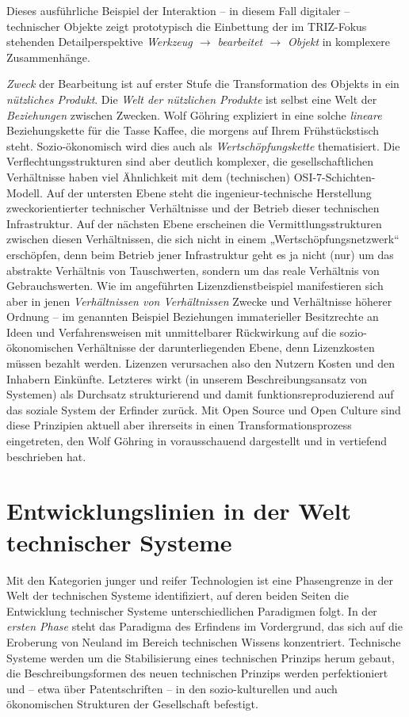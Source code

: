\documentclass[12pt,a4paper]{article}
\begin{document}
Dieses ausführliche Beispiel der Interaktion -- in diesem Fall digitaler --
technischer Objekte zeigt prototypisch die Einbettung der im TRIZ-Fokus
stehenden Detailperspektive \emph{Werkzeug $\to$ bearbeitet $\to$ Objekt} in
komplexere Zusammenhänge.

\emph{Zweck} der Bearbeitung ist auf erster Stufe die Transformation des
Objekts in ein \emph{nützliches Produkt}. Die \emph{Welt der nützlichen
  Produkte} ist selbst eine Welt der \emph{Beziehungen} zwischen Zwecken.
Wolf Göhring expliziert in \cite{Goehring1999} eine solche \emph{lineare}
Beziehungskette für die Tasse Kaffee, die morgens auf Ihrem Frühstückstisch
steht. Sozio-ökonomisch wird dies auch als \emph{Wertschöpfungskette}
thematisiert. Die Verflechtungsstrukturen sind aber deutlich komplexer, die
gesellschaftlichen Verhältnisse haben viel Ähnlichkeit mit dem (technischen)
OSI-7-Schichten-Modell. Auf der untersten Ebene steht die ingenieur-technische
Herstellung zweckorientierter technischer Verhältnisse und der Betrieb dieser
technischen Infrastruktur.  Auf der nächsten Ebene erscheinen die
Vermittlungsstrukturen zwischen diesen Verhältnissen, die sich nicht in einem
„Wertschöpfungsnetzwerk“ erschöpfen, denn beim Betrieb jener Infrastruktur
geht es ja nicht (nur) um das abstrakte Verhältnis von Tauschwerten, sondern
um das reale Verhältnis von Gebrauchswerten.  Wie im angeführten
Lizenzdienstbeispiel manifestieren sich aber in jenen \emph{Verhältnissen von
  Verhältnissen} Zwecke und Verhältnisse höherer Ordnung -- im genannten
Beispiel Beziehungen immaterieller Besitzrechte an Ideen und Verfahrensweisen
mit unmittelbarer Rückwirkung auf die sozio-ökonomischen Verhältnisse der
darunterliegenden Ebene, denn Lizenzkosten müssen bezahlt werden.  Lizenzen
verursachen also den Nutzern Kosten und den Inhabern Einkünfte. Letzteres
wirkt (in unserem Beschreibungsansatz von Systemen) als Durchsatz
strukturierend und damit funktionsreproduzierend auf das soziale System der
Erfinder zurück. Mit Open Source und Open Culture sind diese Prinzipien
aktuell aber ihrerseits in einen Transformationsprozess eingetreten, den Wolf
Göhring in \cite{Goehring1999} vorausschauend dargestellt und in
\cite{Goehring2007} vertiefend beschrieben hat.

\section{Entwicklungslinien in der Welt technischer Systeme}

Mit den Kategorien junger und reifer Technologien ist eine Phasengrenze in der
Welt der technischen Systeme identifiziert, auf deren beiden Seiten die
Entwicklung technischer Systeme unterschiedlichen Paradigmen folgt.  In der
\emph{ersten Phase} steht das Paradigma des Erfindens im Vordergrund, das sich
auf die Eroberung von Neuland im Bereich technischen Wissens konzentriert.
Technische Systeme werden um die Stabilisierung eines technischen Prinzips
herum gebaut, die Beschreibungsformen des neuen technischen Prinzips werden
perfektioniert und -- etwa über Patentschriften -- in den sozio-kulturellen
und auch ökonomischen Strukturen der Gesellschaft befestigt.
\end{document}
